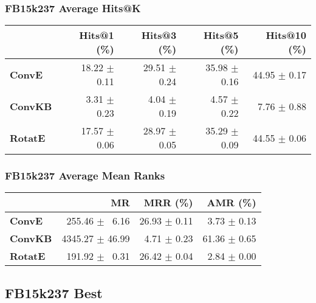 \documentclass{article}
\begin{document}
\subsubsection{FB15k237 Average Hits@K}
    \begin{center}
    \begin{tabular}{lrrrr}
\toprule
{} &   Hits@1 (\%) &   Hits@3 (\%) &   Hits@5 (\%) &  Hits@10 (\%) \\
\midrule
\textbf{ConvE } &  18.22 $\pm$ 0.11 &  29.51 $\pm$ 0.24 &  35.98 $\pm$ 0.16 &  44.95 $\pm$ 0.17 \\
\textbf{ConvKB} &  $\phantom{5}$3.31 $\pm$ 0.23 &  $\phantom{5}$4.04 $\pm$ 0.19 &  $\phantom{5}$4.57 $\pm$ 0.22 &  $\phantom{5}$7.76 $\pm$ 0.88 \\
\textbf{RotatE} &  17.57 $\pm$ 0.06 &  28.97 $\pm$ 0.05 &  35.29 $\pm$ 0.09 &  44.55 $\pm$ 0.06 \\
\bottomrule
\end{tabular}

    \end{center}
\subsubsection{FB15k237 Average Mean Ranks}
    \begin{center}
    \begin{tabular}{lrrr}
\toprule
{} &               MR &      MRR (\%) &      AMR (\%) \\
\midrule
\textbf{ConvE } &  $\phantom{5}$255.46 $\pm$ $\phantom{5}$6.16 &  26.93 $\pm$ 0.11 &  $\phantom{5}$3.73 $\pm$ 0.13 \\
\textbf{ConvKB} &  4345.27 $\pm$ 46.99 &  $\phantom{5}$4.71 $\pm$ 0.23 &  61.36 $\pm$ 0.65 \\
\textbf{RotatE} &  $\phantom{5}$191.92 $\pm$ $\phantom{5}$0.31 &  26.42 $\pm$ 0.04 &  $\phantom{5}$2.84 $\pm$ 0.00 \\
\bottomrule
\end{tabular}

    \end{center}
\subsection{FB15k237 Best}
\end{document}
